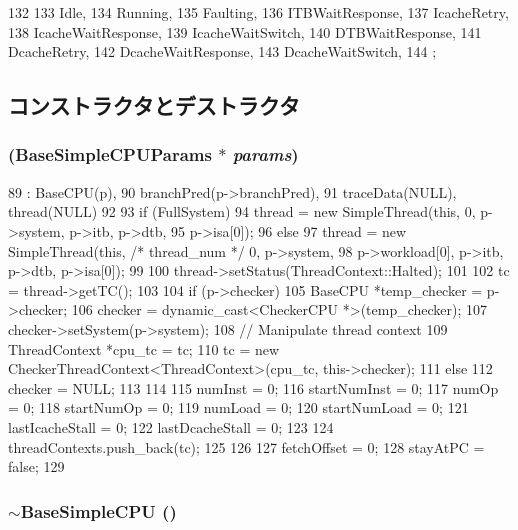 \begin{DoxyCode}
132                 {
133         Idle,
134         Running,
135         Faulting,
136         ITBWaitResponse,
137         IcacheRetry,
138         IcacheWaitResponse,
139         IcacheWaitSwitch,
140         DTBWaitResponse,
141         DcacheRetry,
142         DcacheWaitResponse,
143         DcacheWaitSwitch,
144     };
\end{DoxyCode}


\subsection{コンストラクタとデストラクタ}
\hypertarget{classBaseSimpleCPU_a71551db7d052136dcf3e0ff87f935568}{
\subsubsection[{BaseSimpleCPU}]{ (BaseSimpleCPUParams $\ast$ {\em params})}}
\label{classBaseSimpleCPU_a71551db7d052136dcf3e0ff87f935568}



\begin{DoxyCode}
89     : BaseCPU(p),
90       branchPred(p->branchPred),
91       traceData(NULL), thread(NULL)
92 {
93     if (FullSystem)
94         thread = new SimpleThread(this, 0, p->system, p->itb, p->dtb,
95                                   p->isa[0]);
96     else
97         thread = new SimpleThread(this, /* thread_num */ 0, p->system,
98                                   p->workload[0], p->itb, p->dtb, p->isa[0]);
99 
100     thread->setStatus(ThreadContext::Halted);
101 
102     tc = thread->getTC();
103 
104     if (p->checker) {
105         BaseCPU *temp_checker = p->checker;
106         checker = dynamic_cast<CheckerCPU *>(temp_checker);
107         checker->setSystem(p->system);
108         // Manipulate thread context
109         ThreadContext *cpu_tc = tc;
110         tc = new CheckerThreadContext<ThreadContext>(cpu_tc, this->checker);
111     } else {
112         checker = NULL;
113     }
114 
115     numInst = 0;
116     startNumInst = 0;
117     numOp = 0;
118     startNumOp = 0;
119     numLoad = 0;
120     startNumLoad = 0;
121     lastIcacheStall = 0;
122     lastDcacheStall = 0;
123 
124     threadContexts.push_back(tc);
125 
126 
127     fetchOffset = 0;
128     stayAtPC = false;
129 }
\end{DoxyCode}
\hypertarget{classBaseSimpleCPU_a42056bddf302c92cf50f79e3d184ccfa}{
\subsubsection[{$\sim$BaseSimpleCPU}]{\setlength{\rightskip}{0pt plus 5cm}$\sim${\bf BaseSimpleCPU} ()}}
\label{classBaseSimpleCPU_a42056bddf302c92cf50f79e3d184ccfa}



